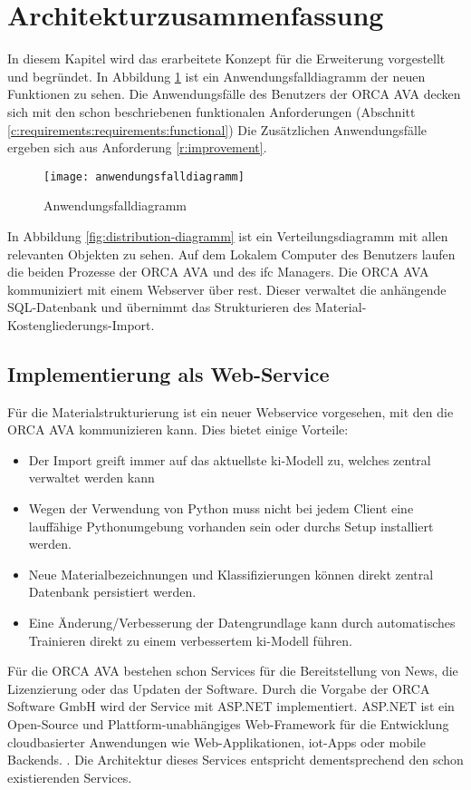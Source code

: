 \section{Architekturzusammenfassung}
\label{c:conception:architecture}
In diesem Kapitel wird das erarbeitete Konzept für die Erweiterung vorgestellt und begründet. In Abbildung \ref{fig:usecasediagramm} ist ein Anwendungsfalldiagramm der neuen Funktionen zu sehen. Die Anwendungsfälle des Benutzers der ORCA AVA decken sich mit den schon beschriebenen funktionalen Anforderungen (Abschnitt \ref{c:requirements:requirements:functional}) Die Zusätzlichen Anwendungsfälle ergeben sich aus Anforderung \ref{r:improvement}.

\begin{figure}[h]
	\centering
	\texttt{[image: anwendungsfalldiagramm]}
	\caption[Anwendungsfalldiagramm]{Anwendungsfalldiagramm}
	\label{fig:usecasediagramm}
\end{figure}

In Abbildung \ref{fig:distribution-diagramm} ist ein Verteilungsdiagramm mit allen relevanten Objekten zu sehen. Auf dem Lokalem Computer des Benutzers laufen die beiden Prozesse der ORCA AVA und des \ac{ifc} Managers. Die ORCA AVA kommuniziert mit einem Webserver über \ac{rest}. Dieser verwaltet die anhängende SQL-Datenbank und übernimmt das Strukturieren des Material-Kostengliederungs-Import.

\subsection{Implementierung als Web-Service}
\label{c:conception:service}
Für die Materialstrukturierung ist ein neuer Webservice vorgesehen, mit den die ORCA AVA kommunizieren kann. Dies bietet einige Vorteile:

\begin{itemize}
	\setlength\itemsep{0.3em}
	\item Der Import greift immer auf das aktuellste \ac{ki}-Modell zu, welches zentral verwaltet werden kann
	\item Wegen der Verwendung von Python muss nicht bei jedem Client eine lauffähige Pythonumgebung vorhanden sein oder durchs Setup installiert werden.
	\item Neue Materialbezeichnungen und Klassifizierungen können direkt zentral Datenbank persistiert werden.
	\item Eine Änderung/Verbesserung der Datengrundlage kann durch automatisches Trainieren direkt zu einem verbessertem \ac{ki}-Modell führen.
\end{itemize}
Für die ORCA AVA bestehen schon Services für die Bereitstellung von News, die Lizenzierung oder das Updaten der Software. Durch die Vorgabe der ORCA Software GmbH wird der Service mit ASP.NET implementiert. ASP.NET ist ein Open-Source und Plattform-unabhängiges Web-Framework für die Entwicklung cloudbasierter Anwendungen wie Web-Applikationen, \ac{iot}-Apps oder mobile Backends. \citep{asp-net}. Die Architektur dieses Services entspricht dementsprechend den schon existierenden Services.

